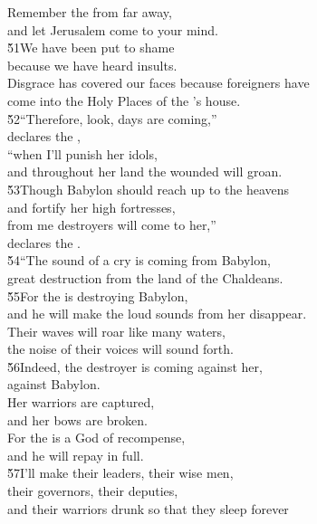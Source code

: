 \begin{poetry}
\poeml Remember the  from far away, \\
\poemll    and let Jerusalem come to your mind. \\
\poeml \v{51}We have been put to shame \\
\poemll    because we have heard insults. \\
\poeml Disgrace has covered our faces because foreigners have \\
\poemll    come into the Holy Places of the 's house. \\
\poeml \v{52}``Therefore, look, days are coming,'' \\
\poemll    declares the , \\
\poeml ``when I'll punish her idols, \\
\poemll    and throughout her land the wounded will groan. \\
\poeml \v{53}Though Babylon should reach up to the heavens \\
\poemll    and fortify her high fortresses, \\
\poeml from me destroyers will come to her,'' \\
\poemll    declares the . \\
\poeml \v{54}``The sound of a cry is coming from Babylon, \\
\poemll    great destruction from the land of the Chaldeans. \\
\poeml \v{55}For the  is destroying Babylon, \\
\poemll    and he will make the loud sounds from her disappear. \\
\poeml Their waves will roar like many waters, \\
\poemll    the noise of their voices will sound forth. \\
\poeml \v{56}Indeed, the destroyer is coming against her, \\
\poemll    against Babylon. \\
\poeml Her warriors are captured, \\
\poemll    and her bows are broken. \\
\poeml For the  is a God of recompense, \\
\poemll    and he will repay in full. \\
\poeml \v{57}I'll make their leaders, their wise men, \\
\poemll    their governors, their deputies, \\
\poeml and their warriors drunk so that they sleep forever \\

\end{poetry}
